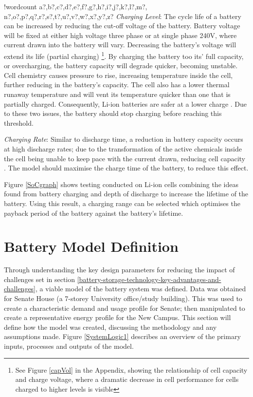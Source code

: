 \documentclass[fontsize=9.5pt]{extarticle}
\numberwithin{figure}{section} %
\newcounter{words}
\newenvironment{counted}{%
  \setcounter{words}{0}
  \SearchList!{wordcount}{\stepcounter{words}}
    {a?,b?,c?,d?,e?,f?,g?,h?,i?,j?,k?,l?,m?,
    n?,o?,p?,q?,r?,s?,t?,u?,v?,w?,x?,y?,z?}
  \UndoBoundary{'}
  \SearchOrder{p;}}{%
  \StopSearching}
\begin{document}
\begin{counted}
\emph{Charging Level}: The cycle life of a battery can be increased by
reducing the cut-off voltage of the battery. Battery voltage will be
fixed at either high voltage three phase or at single phase 240V, where
current drawn into the battery will vary. Decreasing the battery's
voltage will extend its life (partial charging) \cite{Choi2002130}
\footnote{ See Figure \ref{capVol} in the Appendix, showing the relationship of cell capacity and charge voltage, where  a dramatic decrease in cell performance for cells charged to higher levels is visible}.
By charging the battery too its' full capacity, or overcharging, the
battery capacity will degrade quicker, becoming unstable. Cell chemistry
causes pressure to rise, increasing temperature inside the cell, further
reducing in the battery's capacity. The cell also has a lower thermal
runaway temperature and will vent its temperature quicker than one that
is partially charged. Consequently, Li-ion batteries are safer at a
lower charge \cite{Charging53:online}. Due to these two issues, the
battery should stop charging before reaching this threshold.

\emph{Charging Rate}: Similar to discharge time, a reduction in battery
capacity occurs at high discharge rates; due to the transformation of
the active chemicals inside the cell being unable to keep pace with the
current drawn, reducing cell capacity \cite{BatteryL10:online}. The
model should maximise the charge time of the battery, to reduce this
effect.

Figure \ref{SoCgraph} shows testing conducted on Li-ion cells combining
the ideas found from battery charging and depth of discharge to increase
the lifetime of the battery. Using this result, a charging range can be
selected which optimises the payback period of the battery against the
battery's lifetime.

\section{Battery Model Definition}\label{battery-model-definition}

Through understanding the key design parameters for reducing the impact
of challenges set in section
\ref{battery-storage-technology-key-advantages-and-challenges}, a viable
model of the battery system was defined. Data was obtained for Senate
House (a 7-storey University office/study building). This was used to
create a characteristic demand and usage profile for Senate; then
manipulated to create a representative energy profile for the New
Campus. This section will define how the model was created, discussing
the methodology and any assumptions made. Figure \ref{SystemLogic1}
describes an overview of the primary inputs, processes and outputs of
the model.


\end{counted}
\end{document}
